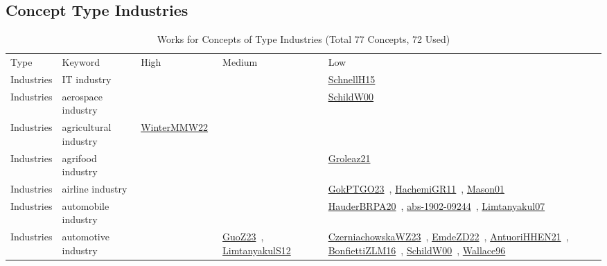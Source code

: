 \clearpage
\subsection{Concept Type Industries}
\label{sec:Industries}
\label{Industries}
{\scriptsize
\begin{longtable}{lp{3cm}>{\raggedright\arraybackslash}p{6cm}>{\raggedright\arraybackslash}p{6cm}>{\raggedright\arraybackslash}p{8cm}}
\rowcolor{white}\caption{Works for Concepts of Type Industries (Total 77 Concepts, 72 Used)}\\ \toprule
\rowcolor{white}Type & Keyword & High & Medium & Low\\ \midrule\endhead
\bottomrule
\endfoot
\index{IT industry}\index{Industries!IT industry}Industries & IT industry &  &  & \href{../works/SchnellH15.pdf}{SchnellH15}~\cite{SchnellH15}\\
\index{aerospace industry}\index{Industries!aerospace industry}Industries & aerospace industry &  &  & \href{../works/SchildW00.pdf}{SchildW00}~\cite{SchildW00}\\
\index{agricultural industry}\index{Industries!agricultural industry}Industries & agricultural industry & \href{../works/WinterMMW22.pdf}{WinterMMW22}~\cite{WinterMMW22} &  & \\
\index{agrifood industry}\index{Industries!agrifood industry}Industries & agrifood industry &  &  & \href{../works/Groleaz21.pdf}{Groleaz21}~\cite{Groleaz21}\\
\index{airline industry}\index{Industries!airline industry}Industries & airline industry &  &  & \href{../works/GokPTGO23.pdf}{GokPTGO23}~\cite{GokPTGO23}, \href{../works/HachemiGR11.pdf}{HachemiGR11}~\cite{HachemiGR11}, \href{../works/Mason01.pdf}{Mason01}~\cite{Mason01}\\
\index{automobile industry}\index{Industries!automobile industry}Industries & automobile industry &  &  & \href{../works/HauderBRPA20.pdf}{HauderBRPA20}~\cite{HauderBRPA20}, \href{../works/abs-1902-09244.pdf}{abs-1902-09244}~\cite{abs-1902-09244}, \href{../works/Limtanyakul07.pdf}{Limtanyakul07}~\cite{Limtanyakul07}\\
\index{automotive industry}\index{Industries!automotive industry}Industries & automotive industry &  & \href{../works/GuoZ23.pdf}{GuoZ23}~\cite{GuoZ23}, \href{../works/LimtanyakulS12.pdf}{LimtanyakulS12}~\cite{LimtanyakulS12} & \href{../works/CzerniachowskaWZ23.pdf}{CzerniachowskaWZ23}~\cite{CzerniachowskaWZ23}, \href{../works/EmdeZD22.pdf}{EmdeZD22}~\cite{EmdeZD22}, \href{../works/AntuoriHHEN21.pdf}{AntuoriHHEN21}~\cite{AntuoriHHEN21}, \href{../works/BonfiettiZLM16.pdf}{BonfiettiZLM16}~\cite{BonfiettiZLM16}, \href{../works/SchildW00.pdf}{SchildW00}~\cite{SchildW00}, \href{../works/Wallace96.pdf}{Wallace96}~\cite{Wallace96}\\

\end{longtable}}

